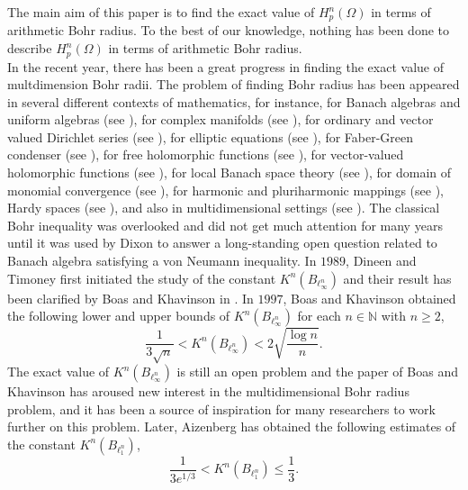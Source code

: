 \documentclass[a4paper,12pt]{amsart}
\theoremstyle{definition}
\begin{document}
The main aim of this paper is to find the exact value of $H^{n}_{p}(\Omega)$ in terms of arithmetic Bohr radius. To the best of our knowledge, nothing has been done to describe $H^{n}_{p}(\Omega)$ in terms of arithmetic Bohr radius.\\[2mm]


In the recent year, there has been a great progress in finding the exact value of multdimension Bohr radii. The problem of finding Bohr radius has been appeared in  several different contexts of mathematics, for instance, for Banach algebras and uniform algebras (see  \cite{paulsen-2002,paulsen-2004}), for complex manifolds (see \cite{aizn-2000b,aizenberg-2001a}), for ordinary and vector valued Dirichlet series (see \cite{bala-2006,defant-2008}), for elliptic equations (see \cite{aizenberg-2001b}), for Faber-Green condenser (see \cite{lassère-2017}), for free holomorphic functions (see \cite{popescu-2019}), for vector-valued holomorphic functions (see \cite{defant-2012}), for local Banach space theory (see \cite{defant-2003}), for domain of monomial convergence (see \cite{defant-2009}), for harmonic and pluriharmonic mappings (see \cite{hamada-2022-JFA}), Hardy spaces (see \cite{bene-2004}), and also in multidimensional settings (see \cite{aizn-2000a,boas-1997,boas-2000,defant-2004, defant-2006,Liu-Pon-PAMS-2020}).
The classical Bohr inequality was overlooked and did not get much attention for many years until it was used by Dixon \cite{Dixon & BLMS & 1995} to answer a long-standing open question related to Banach algebra satisfying a von Neumann inequality. In $1989$, Dineen and Timoney \cite{Dineen-Timoney-1989} first initiated the study of the constant $K^n(B_{\ell^n _\infty})$ and their result has been clarified by Boas and Khavinson in \cite{boas-1997}. In $1997$, Boas and Khavinson \cite{boas-1997} obtained the following lower and upper bounds of $K^n(B_{\ell^n _\infty})$ for each $n \in \mathbb{N}$ with $n \geq 2$,
\begin{equation}\label{Pal-Vasu-P3-e-1.1}
	\frac{1}{3\sqrt{n}} < K^n(B_{\ell^n _\infty}) < 2 \sqrt{\frac{\log n}{n}}.	
\end{equation}
The exact value of $K^n(B_{\ell^n _\infty})$ is still an open problem and the paper of Boas and Khavinson \cite{boas-2000} has aroused new interest in the multidimensional Bohr radius problem, and it has been a source of inspiration for many researchers to work further on this problem. Later, Aizenberg \cite{aizn-2000a} has obtained the following estimates of the constant $K^n(B_{\ell^n _1})$,
\begin{equation}\label{Pal-Vasu-P3-e-1.2}
	\frac{1}{3e^{1/3}} < K^n(B_{\ell^n _1}) \leq \frac{1}{3}.
\end{equation}
\end{document}

